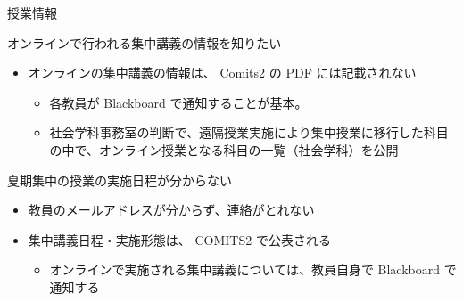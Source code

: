 \documentclass[a4j,10pt]{jsarticle}
\def\lthtmlcheckvsize{\ifdim\ht\sizebox<\vsize 
  \ifdim\wd\sizebox<\hsize\expandafter\hfill\fi \expandafter\vfill
  \else\expandafter\vss\fi}%
\begin{document}
{\begin{frame}[label={sec:orgf983361},fragile]{授業情報}
\begin{block}{オンラインで行われる集中講義の情報を知りたい}
\begin{itemize}
\item オンラインの集中講義の情報は、 Comits2 の PDF には記載されない
\begin{itemize}
\item 各教員が Blackboard で通知することが基本。
\item 社会学科事務室の判断で、遠隔授業実施により集中授業に移行した科目の中で、オンライン授業となる科目の一覧（社会学科）を公開
\end{itemize}
\end{itemize}
\end{block}
\par
\begin{block}{夏期集中の授業の実施日程が分からない}
\begin{itemize}
\item 教員のメールアドレスが分からず、連絡がとれない
\item 集中講義日程・実施形態は、 COMITS2 で公表される
\begin{itemize}
\item オンラインで実施される集中講義については、教員自身で Blackboard で通知する
\end{itemize}
\end{itemize}
\end{block}
\end{frame}%
\lthtmlfigureZ
\lthtmlcheckvsize\clearpage}
\end{document}
